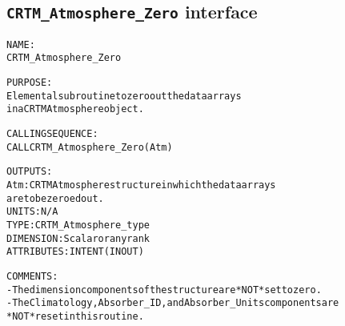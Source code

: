 \subsection{\texttt{CRTM\_Atmosphere\_Zero} interface}
  \label{sec:CRTM_Atmosphere_Zero_interface}
  \begin{alltt}
 
  NAME:
        CRTM_Atmosphere_Zero
 
  PURPOSE:
        Elemental subroutine to zero out the data arrays
        in a CRTM Atmosphere object.
 
  CALLING SEQUENCE:
        CALL CRTM_Atmosphere_Zero( Atm )
 
  OUTPUTS:
        Atm:          CRTM Atmosphere structure in which the data arrays
                      are to be zeroed out.
                      UNITS:      N/A
                      TYPE:       CRTM_Atmosphere_type
                      DIMENSION:  Scalar or any rank
                      ATTRIBUTES: INTENT(IN OUT)
 
  COMMENTS:
        - The dimension components of the structure are *NOT* set to zero.
        - The Climatology, Absorber_ID, and Absorber_Units components are
          *NOT* reset in this routine.
 
  \end{alltt}
